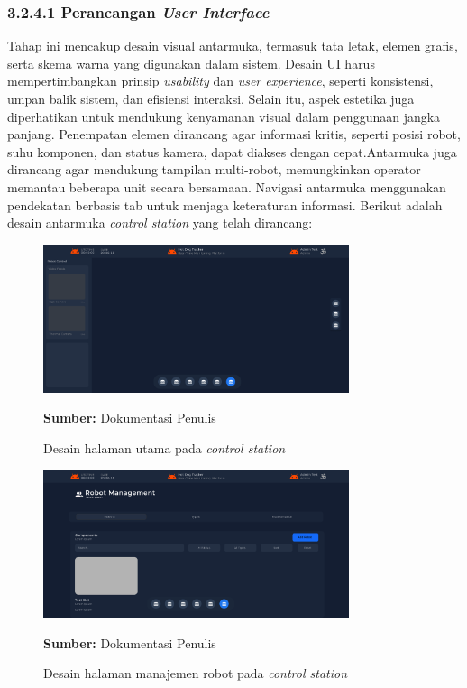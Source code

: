 \subsubsection{3.2.4.1 Perancangan \emph{User Interface}}

Tahap ini mencakup desain visual antarmuka, termasuk tata letak, elemen grafis, serta skema warna yang digunakan dalam sistem. Desain UI harus mempertimbangkan prinsip \emph{usability} dan \emph{user experience}, seperti konsistensi, umpan balik sistem, dan efisiensi interaksi. Selain itu, aspek estetika juga diperhatikan untuk mendukung kenyamanan visual dalam penggunaan jangka panjang. Penempatan elemen dirancang agar informasi kritis, seperti posisi robot, suhu komponen, dan status kamera, dapat diakses dengan cepat.Antarmuka juga dirancang agar mendukung tampilan multi-robot, memungkinkan operator memantau beberapa unit secara bersamaan. Navigasi antarmuka menggunakan pendekatan berbasis tab untuk menjaga keteraturan informasi. Berikut adalah desain antarmuka \emph{control station} yang telah dirancang:

\begin{figure}[H]
  \centering
  \includegraphics[width=0.8\textwidth]{gambar/bab3/homepage.png}
  \caption{Desain halaman utama pada \emph{control station}}
  \label{fig:control-station-robot-main}
  \footnotesize{\textbf{Sumber:} Dokumentasi Penulis}
\end{figure}

\begin{figure}[H]
  \centering
  \includegraphics[width=0.8\textwidth]{gambar/bab3/robot-ui.png}
  \caption{Desain halaman manajemen robot pada \emph{control station}}
  \label{fig:control-station-robot-robot}
  \footnotesize{\textbf{Sumber:} Dokumentasi Penulis}
\end{figure}

